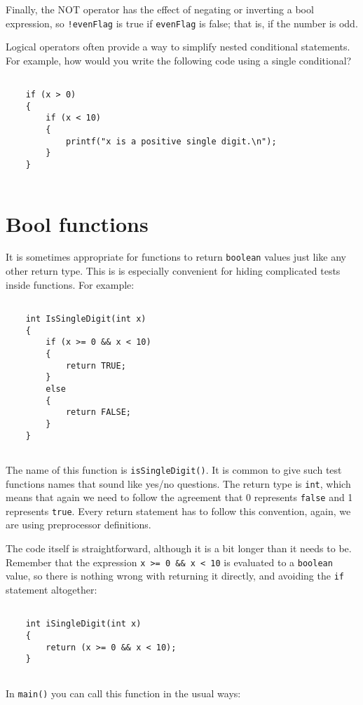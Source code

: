 Finally, the NOT operator has the effect of negating or
inverting a bool expression, so {\tt !evenFlag} is true
if {\tt evenFlag} is false; that is, if the number is odd.


Logical operators often provide a way to simplify nested
conditional statements.  For example, how would you write
the following code using a single conditional?

\begin{verbatim}

    if (x > 0) 
    {
        if (x < 10) 
        {
            printf("x is a positive single digit.\n");
        }
    }
    
\end{verbatim}

\section{Bool functions}
\label{bool}

It is sometimes appropriate for functions to return {\tt boolean} values just 
like any other return type. This is 
is especially convenient for hiding complicated tests inside
functions.  For example:

\begin{verbatim}

    int IsSingleDigit(int x)
    {
        if (x >= 0 && x < 10) 
        {
            return TRUE;
        } 
        else 
        {
            return FALSE;
        }
    }
    
\end{verbatim}
%
The name of this function is {\tt isSingleDigit()}.  It is common
to give such test functions names that sound like yes/no questions.
The return type is {\tt int}, which means that again we need
to follow the agreement that  0 represents {\tt false} and 1 
represents {\tt true}. Every return
statement has to follow this convention, again, we are using
preprocessor definitions.

The code itself is straightforward, although it is a bit longer than
it needs to be.  Remember that the expression {\tt x >= 0 \&\& x < 10}
is evaluated to a {\tt boolean} value, so there is nothing wrong with returning it
directly, and avoiding the {\tt if} statement altogether:

\begin{verbatim}

    int iSingleDigit(int x)
    {
        return (x >= 0 && x < 10);
    }
    
\end{verbatim}
%
In {\tt main()} you can call this function in the usual ways:

